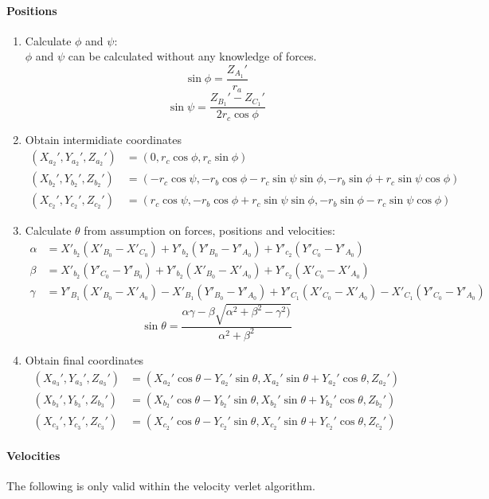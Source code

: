 \paragraph{Positions}
\begin{enumerate}
\item Calculate $\phi$ and $\psi$: \\
$\phi$ and $\psi$ can be calculated without any knowledge of forces.
\begin{equation}
\sin\phi = \frac{Z_{A_1}'}{r_a}
\end{equation}
\begin{equation}
\sin\psi = \frac{Z_{B_1}' - Z_{C_1}'}{2r_c\cos\phi}
\end{equation}

\item Obtain intermidiate coordinates
\begin{align}
(X_{a_2}', Y_{a_2}',Z_{a_2}') &= (0, r_c\cos\phi, r_c\sin\phi)\\
(X_{b_2}', Y_{b_2}',Z_{b_2}') &= (-r_c\cos\psi, -r_b\cos\phi - r_c\sin\psi\sin\phi, -r_b\sin\phi + r_c\sin\psi\cos\phi)\\
(X_{c_2}', Y_{c_2}',Z_{c_2}') &= (r_c\cos\psi, -r_b\cos\phi + r_c\sin\psi\sin\phi, -r_b\sin\phi - r_c\sin\psi\cos\phi)
\end{align}

\item Calculate $\theta$ from assumption on forces, positions and velocities: \\
\begin{align}
	\alpha &= X'_{b_2} ( X'_{B_0}  -X'_{C_0})  +
	Y'_{b_2}( Y'_{B_0}  -Y'_{A_0}) 	+
		Y'_{c_2}( Y'_{C_0}  -Y'_{A_0}) \\
	\beta &= X'_{b_2} ( Y'_{C_0}  -Y'_{B_0})
		 		+Y'_{b_2}( X'_{B_0}  -X'_{A_0}) 	+
		 		Y'_{c_2}( X'_{C_0}  -X'_{A_0}) \\
	\gamma &= Y'_{B_1} ( X'_{B_0}  -X'_{A_0})
			-X'_{B_1}( Y'_{B_0}  -Y'_{A_0}) 	+
			Y'_{C_1}( X'_{C_0}  -X'_{A_0}) 	-
			X'_{C_1}( Y'_{C_0} - Y'_{A_0})
\end{align}
\begin{equation}
\sin \theta = \frac{\alpha\gamma - \beta \sqrt{\alpha^2 + \beta^2 - \gamma^2 )}}{\alpha^2 + \beta^2}
\end{equation}

\item Obtain final coordinates
\begin{align}
(X_{a_3}', Y_{a_3}',Z_{a_3}') &= 	(X_{a_2}' \cos\theta - Y_{a_2}'\sin\theta,
									 X_{a_2}' \sin\theta + Y_{a_2}'\cos\theta, Z_{a_2}')\\
(X_{b_3}', Y_{b_3}',Z_{b_3}') &= 	(X_{b_2}' \cos\theta - Y_{b_2}'\sin\theta, 
									 X_{b_2}' \sin\theta + Y_{b_2}'\cos\theta, Z_{b_2}')\\
(X_{c_3}', Y_{c_3}',Z_{c_3}') &=	(X_{c_2}' \cos\theta - Y_{c_2}'\sin\theta, 
									 X_{c_2}' \sin\theta + Y_{c_2}'\cos\theta, Z_{c_2}')
\end{align}
\end{enumerate}

\paragraph{Velocities}
The following is only valid within the velocity verlet algorithm.
